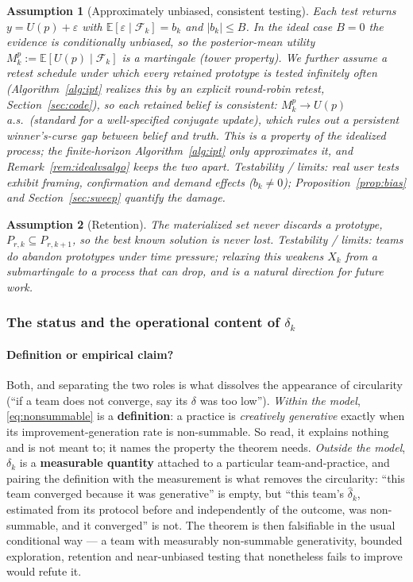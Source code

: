 \documentclass[11pt]{article}
\newtheorem{assumption}{Assumption}
\newcommand{\E}{\mathbb{E}}
\newcommand{\filt}{\mathcal{F}}     %
\begin{document}
\begin{assumption}[Approximately unbiased, consistent testing]
\label{as:unbiased}
Each test returns $y = U(p) + \varepsilon$ with $\E[\varepsilon\mid\filt_k]=b_k$ and $|b_k|\le B$. In the ideal case $B=0$ the evidence is conditionally unbiased, so the posterior-mean utility $M_k^{p}:=\E[U(p)\mid\filt_k]$ is a martingale (tower property). We further assume a retest schedule under which every \emph{retained} prototype is tested infinitely often (Algorithm~\ref{alg:ipt} realizes this by an explicit round-robin retest, Section~\ref{sec:code}), so each retained belief is \emph{consistent}: $M_k^{p}\to U(p)$ a.s.\ (standard for a well-specified conjugate update), which rules out a persistent winner's-curse gap between belief and truth. This is a property of the \emph{idealized} process; the finite-horizon Algorithm~\ref{alg:ipt} only approximates it, and Remark~\ref{rem:idealvsalgo} keeps the two apart. \emph{Testability / limits:} real user tests exhibit framing, confirmation and demand effects ($b_k\neq0$); Proposition~\ref{prop:bias} and Section~\ref{sec:sweep} quantify the damage.
\end{assumption}

\begin{assumption}[Retention]
\label{as:retention}
The materialized set never discards a prototype, $P_{r,k}\subseteq P_{r,k+1}$, so the best known solution is never lost. \emph{Testability / limits:} teams do abandon prototypes under time pressure; relaxing this weakens $X_k$ from a submartingale to a process that can drop, and is a natural direction for future work.
\end{assumption}

\subsubsection*{The status and the operational content of $\delta_k$}
\label{sec:delta}

\paragraph{Definition or empirical claim?} Both, and separating the two roles is what dissolves the appearance of circularity (``if a team does not converge, say its $\delta$ was too low''). \emph{Within the model}, \eqref{eq:nonsummable} is a \textbf{definition}: a practice is \emph{creatively generative} exactly when its improvement-generation rate is non-summable. So read, it explains nothing and is not meant to; it names the property the theorem needs. \emph{Outside the model}, $\delta_k$ is a \textbf{measurable quantity} attached to a particular team-and-practice, and pairing the definition with the measurement is what removes the circularity: ``this team converged because it was generative'' is empty, but ``this team's $\hat\delta_k$, estimated from its protocol before and independently of the outcome, was non-summable, and it converged'' is not. The theorem is then falsifiable in the usual conditional way --- a team with measurably non-summable generativity, bounded exploration, retention and near-unbiased testing that nonetheless fails to improve would refute it.
\end{document}
